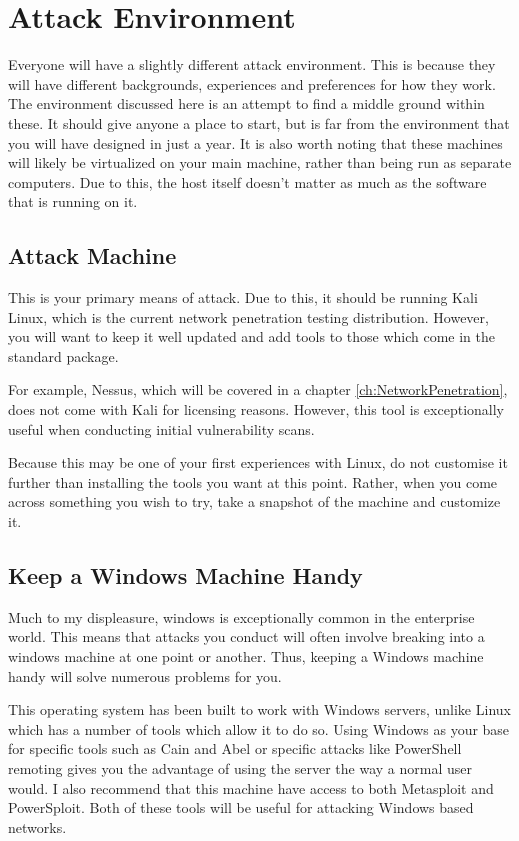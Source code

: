 	\section{Attack Environment}
		Everyone will have a slightly different attack environment.
		This is because they will have different backgrounds, experiences and preferences for how they work.
		The environment discussed here is an attempt to find a middle ground within these.
		It should give anyone a place to start, but is far from the environment that you will have designed in just a year.
		It is also worth noting that these machines will likely be virtualized on your main machine, rather than being run as separate computers\cite{playbook}.
		Due to this, the host itself doesn't matter as much as the software that is running on it.

		\subsection{Attack Machine}
			This is your primary means of attack.
			Due to this, it should be running Kali Linux, which is the current network penetration testing distribution.
			However, you will want to keep it well updated and add tools to those which come in the standard package.

			For example, Nessus, which will be covered in a chapter \ref{ch:NetworkPenetration},
			does not come with Kali for licensing reasons.
			However, this tool is exceptionally useful when conducting initial vulnerability scans.

			Because this may be one of your first experiences with Linux, do not customise it further than installing the tools you want at this point.
			Rather, when you come across something you wish to try, take a snapshot of the machine and customize it.

		\subsection{Keep a Windows Machine Handy}
			Much to my displeasure, windows is exceptionally common in the enterprise world.
			This means that attacks you conduct will often involve breaking into a windows machine at one point or another.
			Thus, keeping a Windows machine handy will solve numerous problems for you.

			This operating system has been built to work with Windows servers, unlike Linux which has a number of tools which allow it to do so.
			Using Windows as your base for specific tools such as Cain and Abel or specific attacks like PowerShell remoting gives you the advantage of using the server the way a normal user would.
			I also recommend that this machine have access to both Metasploit and PowerSploit.
			Both of these tools will be useful for attacking Windows based networks.

